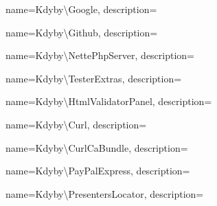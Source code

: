  {
  name={Kdy\-by\textbackslash{}Google},
  description={} }

 {
  name={Kdy\-by\textbackslash{}Git\-hub},
  description={} }

 {
  name={Kdy\-by\textbackslash{}Nette\-Php\-Ser\-ver},
  description={} }

 {
  name={Kdy\-by\textbackslash{}Tes\-ter\-Ex\-tras},
  description={} }

 {
  name={Kdy\-by\textbackslash{}Html\-Va\-li\-da\-tor\-Pa\-nel},
  description={} }

 {
  name={Kdy\-by\textbackslash{}Curl},
  description={} }

 {
  name={Kdy\-by\textbackslash{}Curl\-Ca\-Bund\-le},
  description={} }

 {
  name={Kdy\-by\textbackslash{}Pay\-Pal\-Ex\-press},
  description={} }

 {
  name={Kdy\-by\textbackslash{}Pre\-sen\-ters\-Lo\-ca\-tor},
  description={} }
